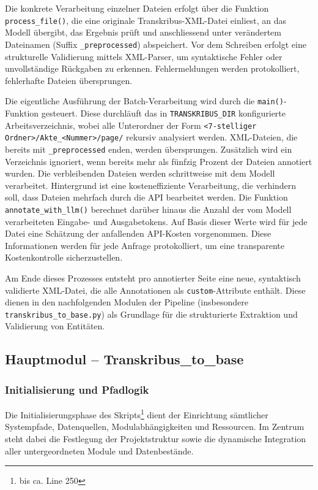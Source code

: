 \documentclass[12pt, a4paper, ngerman, bidi=default]{article}
\newcommand{\code}[1]{\colorbox{VeryLightGray}{\texttt{#1}}} %
\begin{document}
Die konkrete Verarbeitung einzelner Dateien erfolgt über die Funktion \code{process\_file()}, die eine originale Transkribus-XML-Datei einliest,
an das Modell übergibt, das Ergebnis prüft und anschliessend unter verändertem Dateinamen (Suffix \code{\_preprocessed}) abspeichert. Vor dem 
Schreiben erfolgt eine strukturelle Validierung mittels XML-Parser, um syntaktische Fehler oder unvollständige Rückgaben zu 
erkennen. Fehlermeldungen werden protokolliert, fehlerhafte Dateien übersprungen.

Die eigentliche Ausführung der Batch-Verarbeitung wird durch die \code{main()}-Funktion gesteuert. Diese durchläuft das in 
\code{TRANSKRIBUS\_DIR} konfigurierte Arbeitsverzeichnis, wobei alle Unterordner der Form \code{<7-stelliger Ordner>/Akte\_<Nummer>/page/} 
rekursiv analysiert werden. XML-Dateien, die bereits mit \code{\_preprocessed} enden, werden übersprungen. Zusätzlich wird ein Verzeichnis 
ignoriert, wenn bereits mehr als fünfzig Prozent der Dateien annotiert wurden. Die verbleibenden Dateien werden schrittweise mit dem Modell 
verarbeitet. Hintergrund ist eine kosteneffiziente Verarbeitung, die verhindern soll, dass Dateien mehrfach durch die API bearbeitet werden. Die Funktion 
\code{annotate\_with\_llm()} berechnet darüber hinaus die Anzahl der vom Modell verarbeiteten Eingabe- und Ausgabetokens. Auf Basis dieser Werte wird für 
jede Datei eine Schätzung der anfallenden API-Kosten vorgenommen. Diese Informationen werden für jede Anfrage protokolliert, um eine transparente 
Kostenkontrolle sicherzustellen.

Am Ende dieses Prozesses entsteht pro annotierter Seite eine neue, syntaktisch validierte XML-Datei, 
die alle Annotationen als \code{custom}-Attribute enthält. Diese dienen in den nachfolgenden Modulen der 
Pipeline (insbesondere \code{transkribus\_to\_base.py}) als Grundlage für die strukturierte Extraktion und Validierung von Entitäten.


\subsection{Hauptmodul -- Transkribus\_to\_base}\label{sec:transkribus_to_base}
\subsubsection{Initialisierung und Pfadlogik}

Die Initialisierungsphase des Skripts\footnote{bis ca. Line 250} dient der Einrichtung sämtlicher Systempfade, Datenquellen, 
Modulabhängigkeiten und Ressourcen. Im Zentrum steht dabei die Festlegung der Projektstruktur sowie die dynamische Integration aller untergeordneten Module und Datenbestände.
\end{document}
